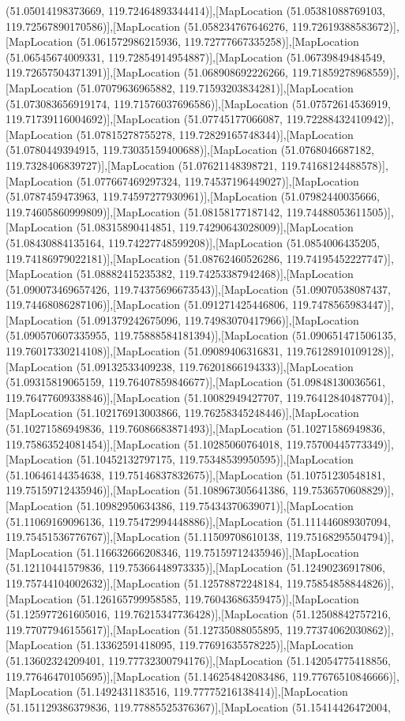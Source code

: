 (51.05014198373669, 119.72464893344414)],[MapLocation (51.05381088769103, 119.72567890170586)],[MapLocation (51.058234767646276, 119.72619388583672)],[MapLocation (51.061572986215936, 119.72777667335258)],[MapLocation (51.06545674009331, 119.72854914954887)],[MapLocation (51.06739849484549, 119.72657504371391)],[MapLocation (51.068908692226266, 119.71859278968559)],[MapLocation (51.07079636965882, 119.71593203834281)],[MapLocation (51.073083656919174, 119.71576037696586)],[MapLocation (51.07572614536919, 119.71739116004692)],[MapLocation (51.07745177066087, 119.72288432410942)],[MapLocation (51.07815278755278, 119.72829165748344)],[MapLocation (51.0780449394915, 119.73035159400688)],[MapLocation (51.0768046687182, 119.7328406839727)],[MapLocation (51.07621148398721, 119.74168124488578)],[MapLocation (51.077667469297324, 119.74537196449027)],[MapLocation (51.0787459473963, 119.74597277930961)],[MapLocation (51.07982440035666, 119.74605860999809)],[MapLocation (51.08158177187142, 119.74488053611505)],[MapLocation (51.08315890414851, 119.74290643028009)],[MapLocation (51.08430884135164, 119.74227748599208)],[MapLocation (51.0854006435205, 119.74186979022181)],[MapLocation (51.08762460526286, 119.74195452227747)],[MapLocation (51.08882415235382, 119.74253387942468)],[MapLocation (51.090073469657426, 119.74375696673543)],[MapLocation (51.09070538087437, 119.74468086287106)],[MapLocation (51.091271425446806, 119.7478565983447)],[MapLocation (51.091379242675096, 119.74983070417966)],[MapLocation (51.090570607335955, 119.75888584181394)],[MapLocation (51.090651471506135, 119.76017330214108)],[MapLocation (51.09089406316831, 119.76128910109128)],[MapLocation (51.09132533409238, 119.76201866194333)],[MapLocation (51.09315819065159, 119.76407859846677)],[MapLocation (51.09848130036561, 119.76477609338846)],[MapLocation (51.10082949427707, 119.76412840487704)],[MapLocation (51.102176913003866, 119.76258345248446)],[MapLocation (51.10271586949836, 119.76086683871493)],[MapLocation (51.10271586949836, 119.75863524081454)],[MapLocation (51.10285060764018, 119.75700445773349)],[MapLocation (51.10452132797175, 119.75348539950595)],[MapLocation (51.10646144354638, 119.75146837832675)],[MapLocation (51.10751230548181, 119.75159712435946)],[MapLocation (51.108967305641386, 119.7536570608829)],[MapLocation (51.10982950634386, 119.75434370639071)],[MapLocation (51.11069169096136, 119.75472994448886)],[MapLocation (51.111446089307094, 119.75451536776767)],[MapLocation (51.11509708610138, 119.75168295504794)],[MapLocation (51.116632666208346, 119.75159712435946)],[MapLocation (51.12110441579836, 119.75366448973335)],[MapLocation (51.12490236917806, 119.75744104002632)],[MapLocation (51.12578872248184, 119.75854858844826)],[MapLocation (51.126165799958585, 119.76043686359475)],[MapLocation (51.125977261605016, 119.76215347736428)],[MapLocation (51.12508842757216, 119.77077946155617)],[MapLocation (51.12735088055895, 119.77374062030862)],[MapLocation (51.13362591418095, 119.77691635578225)],[MapLocation (51.13602324209401, 119.77732300794176)],[MapLocation (51.142054775418856, 119.77646470105695)],[MapLocation (51.146254842083486, 119.77676510846666)],[MapLocation (51.1492431183516, 119.77775216138414)],[MapLocation (51.151129386379836, 119.77885525376367)],[MapLocation (51.15414426472004, 